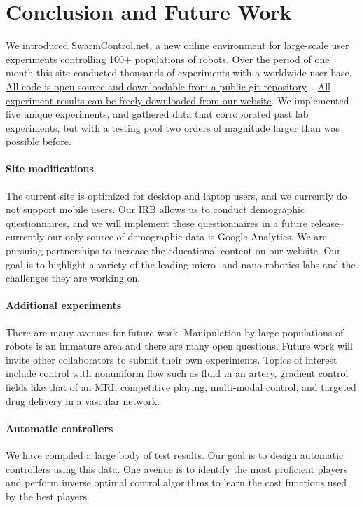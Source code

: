 \section{Conclusion and Future Work}\label{sec:conclusion}
    
We introduced \href{http://www.swarmcontrol.net/}{SwarmControl.net}, a new online environment for large-scale user experiments controlling 100+ populations of robots.  Over the period of one month this site conducted thousands of experiments with a worldwide user base.   \href{https://github.com/crertel/swarmmanipulate.git}{All code is open source and downloadable from a public git repository}~\cite{Chris-Ertel2013}. \href{http://www.swarmcontrol.net/show_results}{All experiment results can be freely downloaded from our website}.  We implemented five unique experiments, and gathered data that corroborated past lab experiments, but with a testing pool two orders of magnitude larger than was possible before.


\paragraph{Site modifications}
  The current site is optimized for desktop and laptop users, and we currently do not support mobile users. Our IRB allows us to conduct demographic questionnaires, and we will implement these questionnaires in a future release--currently our only source of demographic data is Google Analytics. We are pursuing partnerships to increase the educational content on our website. Our goal is to highlight a variety of the leading micro- and nano-robotics labs and the challenges they are working on.

\paragraph{Additional experiments}
There are many avenues for future work.  Manipulation by large populations of robots is an immature area and there are many open questions. Future work will invite other collaborators to submit their own experiments.
Topics of interest include  control with nonuniform flow such as fluid in an artery, gradient control fields like that of an MRI, competitive playing, multi-modal control, and targeted drug delivery in a vascular network.

\paragraph{Automatic controllers}
We have compiled a large body of test results.  Our goal is to design automatic controllers using this data. One avenue is to identify the most proficient players and perform inverse optimal control algorithms to learn the cost functions used by the best players.  


